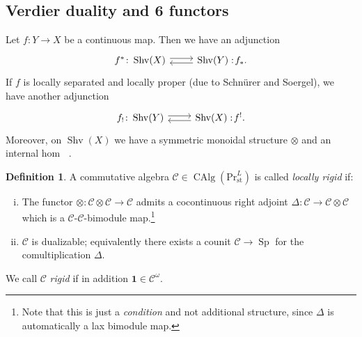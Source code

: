 \documentclass[draft]{amsart}
\newcommand{\ul}[1]{\underline{#1}}
\newcommand{\cat}[1]{\mathcal{#1}}
\newcommand{\noloc}{:\!}
\renewcommand{\Pr}{\mathrm{Pr}}
\newcommand{\one}{\mathbf{1}}
\DeclareMathOperator{\CAlg}{CAlg}
\DeclareMathOperator{\Shv}{Shv}
\DeclareMathOperator{\Sp}{Sp}
\DeclareMathOperator{\iHom}{\ul{Hom}}
\theoremstyle{definition}
\newtheorem{defn}[thm]{Definition}
\begin{document}
\subsection{Verdier duality and 6 functors}
Let $f\colon Y\to X$ be a continuous map. Then we have an adjunction
\[
\begin{tikzcd}
f^* \colon \Shv(X)\ar[r,shift left] & \ar[l,shift left] \Shv(Y) \noloc f_*.
\end{tikzcd}
\]
If $f$ is locally separated and locally proper (due to Schn\"urer and Soergel), we have another adjunction
\[
\begin{tikzcd}
f_! \colon \Shv(Y)\ar[r,shift left] & \ar[l,shift left] \Shv(X) \noloc f^!.
\end{tikzcd}
\]
Moreover, on $\Shv(X)$ we have a symmetric monoidal structure $\otimes$ and an internal hom $\iHom$.

\begin{defn}
A commutative algebra $\cat C \in \CAlg(\Pr^L_{\mathrm{st}})$ is called \emph{locally rigid} if:
\begin{enumerate}[(i)]
\item The functor $\otimes\colon \cat C\otimes \cat C \to \cat C$ admits a cocontinuous right adjoint $\Delta\colon \cat C \to \cat C\otimes \cat C$ which is a $\cat C$-$\cat C$-bimodule map.\footnote{Note that this is just a \emph{condition} and not additional structure, since $\Delta$ is automatically a lax bimodule map.}

\item $\cat C$ is dualizable; equivalently there exists a counit $\cat C\to \Sp$ for the comultiplication $\Delta$.
\end{enumerate}

We call $\cat C$ \emph{rigid} if in addition $\one \in \cat C^\omega$.
\end{defn}
\end{document}
